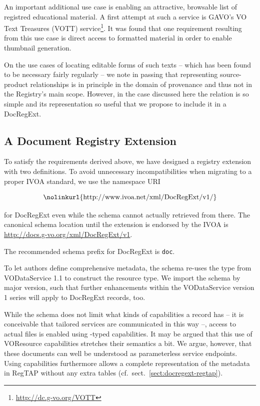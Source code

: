 \documentclass{ivoa}
\begin{document}
An important additional use case is enabling an attractive, browsable
list of registred educational material.  A first attempt at such a
service is GAVO's VO Text Treasures (VOTT)
service\footnote{\url{http://dc.g-vo.org/VOTT}}.  It was found that one
requirement resulting from this use case is direct access to formatted
material in order to enable thumbnail generation.

On the use cases of locating editable forms of such texts – which
has been found to be necessary fairly regularly – we note in passing
that representing source-product relationships is in principle in the
domain of provenance and thus not in the Registry's main scope. However, in
the case discussed here the relation is so simple and its representation
so useful that we propose to include it in a DocRegExt.

\subsection{A Document Registry Extension}


\label{sect:regext-ext}

To satisfy the requirements derived above, we have designed a registry extension with
two definitions. 
To avoid unnecessary incompatibilities when migrating to a proper IVOA
standard, we use the namespace URI

$$\hbox{\nolinkurl{http://www.ivoa.net/xml/DocRegExt/v1/}}$$

for DocRegExt even while the schema cannot actually retrieved from
there.  The canonical schema location until the extension is endorsed by
the IVOA is \url{http://docs.g-vo.org/xml/DocRegExt/v1}.

The recommended schema prefix for DocRegExt is \texttt{doc}.

To let authors define comprehensive metadata, the schema
re-uses the  type
from VODataService 1.1 \citep{2010ivoa.spec.1202P} to construct
the  resource type.  We import the schema by major
version, such that further enhancements within the VODataService version
1 series will apply to DocRegExt records, too.

While the schema does not limit what kinds of capabilities a
 record has -- it is conceivable that tailored
services are communicated in this way --, access to actual files is
enabled using -typed capabilities.  It may be
argued that this use of VOResource capabilities stretches their
semantics a bit.  We argue, however, that these documents can well be
understood as parameterless service endpoints.  Using capabilities
furthermore allows a complete representation of the metadata in RegTAP
without any extra tables (cf.~sect.~\ref{sect:docregext-regtap}).
\end{document}
